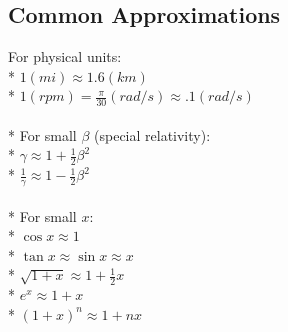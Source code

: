 \subsection{Common Approximations}
For physical units:\\*
\(1(mi)\approx1.6(km)\)\\*
\(1(rpm)=\frac{\pi}{30}(rad/s)\approx.1(rad/s)\)\\\\*
For small \(\beta\) (special relativity):\\*
\(\gamma\approx1+\frac{1}{2}\beta^2\)\\*
\(\frac{1}{\gamma}\approx1-\frac{1}{2}\beta^2\)\\\\*
For small \(x\):\\*
\(\cos{x}\approx1\)\\*
\(\tan{x}\approx\sin{x}\approx x\)\\*
\(\sqrt{1+x}\approx1+\frac{1}{2}x\)\\*
\(e^x\approx1+x\)\\*
\((1+x)^n\approx1+nx\)
